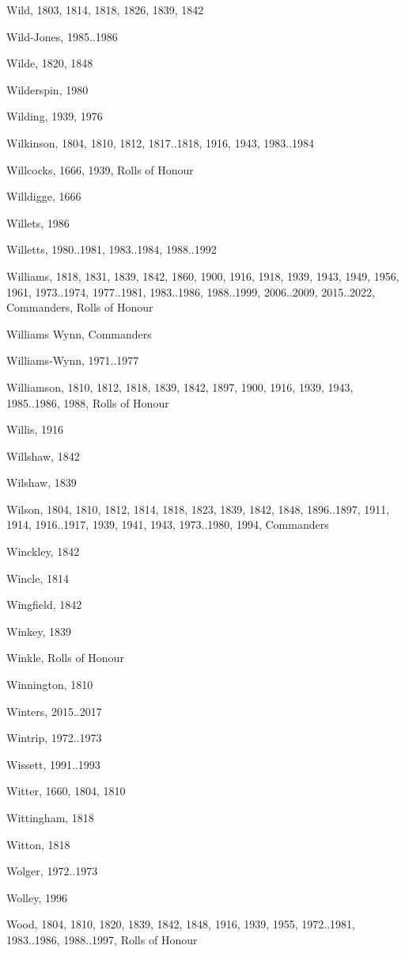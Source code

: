 \begin{theindex}
\item Wild, 1803, 1814, 1818, 1826, 1839, 1842
\item Wild-Jones, 1985..1986
\item Wilde, 1820, 1848
\item Wilderspin, 1980
\item Wilding, 1939, 1976
\item Wilkinson, 1804, 1810, 1812, 1817..1818, 1916, 1943, 1983..1984
\item Willcocks, 1666, 1939, Rolls of Honour
\item Willdigge, 1666
\item Willets, 1986
\item Willetts, 1980..1981, 1983..1984, 1988..1992
\item Williams, 1818, 1831, 1839, 1842, 1860, 1900, 1916, 1918, 1939, 1943, 1949, 1956, 1961, 1973..1974, 1977..1981, 1983..1986, 1988..1999, 2006..2009, 2015..2022, Commanders, Rolls of Honour
\item Williams Wynn, Commanders
\item Williams-Wynn, 1971..1977
\item Williamson, 1810, 1812, 1818, 1839, 1842, 1897, 1900, 1916, 1939, 1943, 1985..1986, 1988, Rolls of Honour
\item Willis, 1916
\item Willshaw, 1842
\item Wilshaw, 1839
\item Wilson, 1804, 1810, 1812, 1814, 1818, 1823, 1839, 1842, 1848, 1896..1897, 1911, 1914, 1916..1917, 1939, 1941, 1943, 1973..1980, 1994, Commanders
\item Winckley, 1842
\item Wincle, 1814
\item Wingfield, 1842
\item Winkey, 1839
\item Winkle, Rolls of Honour
\item Winnington, 1810
\item Winters, 2015..2017
\item Wintrip, 1972..1973
\item Wissett, 1991..1993
\item Witter, 1660, 1804, 1810
\item Wittingham, 1818
\item Witton, 1818
\item Wolger, 1972..1973
\item Wolley, 1996
\item Wood, 1804, 1810, 1820, 1839, 1842, 1848, 1916, 1939, 1955, 1972..1981, 1983..1986, 1988..1997, Rolls of Honour

\end{theindex}
